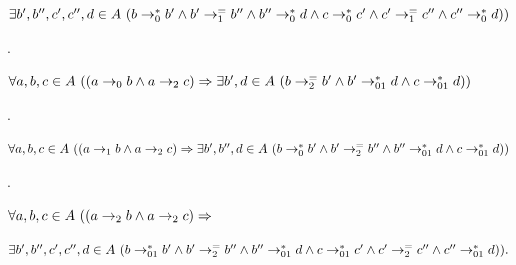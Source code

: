  
 
$\exists b^{\prime},b^{\prime\prime},c^{\prime},c^{\prime\prime},d\in A%
\leavevmode\nobreak\ (b\to_{0}^{*}b^{\prime}\wedge b^{\prime}\to_{1}^{=}b^{%
\prime\prime}\wedge b^{\prime\prime}\to_{0}^{*}d\wedge c\to_{0}^{*}c^{\prime}%
\wedge c^{\prime}\to_{1}^{=}c^{\prime\prime}\wedge c^{\prime\prime}\to_{0}^{*}%
d))$\par
 
 
 
\par{}. 
 
$\forall a,b,c\in A\leavevmode\nobreak\ ((a\to_{0}b\wedge a\to_{2}c)\Rightarrow%
\exists b^{\prime},d\in A\leavevmode\nobreak\ (b\to_{2}^{=}b^{\prime}\wedge b^%
{\prime}\to_{01}^{*}d\wedge c\to_{01}^{*}d))$\par
 
 
 
\par{}. 
 
$\forall a,b,c\in A\leavevmode\nobreak\ ((a\to_{1}b\wedge a\to_{2}c)\Rightarrow%
\exists b^{\prime},b^{\prime\prime},d\in A\leavevmode\nobreak\ (b\to_{0}^{*}b^%
{\prime}\wedge b^{\prime}\to_{2}^{=}b^{\prime\prime}\wedge b^{\prime\prime}\to%
_{01}^{*}d\wedge c\to_{01}^{*}d))$\par
 
 
 
\par{}. 
 
$\forall a,b,c\in A\leavevmode\nobreak\ ((a\to_{2}b\wedge a\to_{2}c)\Rightarrow$\par
 
 
 
$\exists b^{\prime},b^{\prime\prime},c^{\prime},c^{\prime\prime},d\in A%
\leavevmode\nobreak\ (b\to_{01}^{*}b^{\prime}\wedge b^{\prime}\to_{2}^{=}b^{%
\prime\prime}\wedge b^{\prime\prime}\to_{01}^{*}d\wedge c\to_{01}^{*}c^{\prime%
}\wedge c^{\prime}\to_{2}^{=}c^{\prime\prime}\wedge c^{\prime\prime}\to_{01}^{%
*}d)).$\par
 
 
  
 
